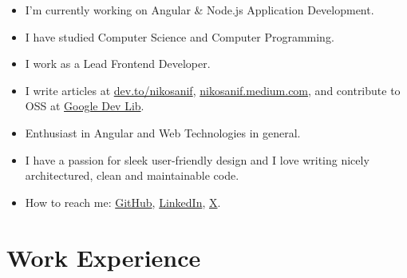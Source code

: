 \documentclass[11pt]{article}
\begin{document}
\footnotesize{
    \begin{itemize}
        \item I'm currently working on Angular \& Node.js Application Development.
        \item I have studied Computer Science and Computer Programming.
        \item I work as a Lead Frontend Developer.
        \item I write articles at 
            \href{https://dev.to/nikosanif}{ dev.to/nikosanif},
            \href{https://nikosanif.medium.com/}{ nikosanif.medium.com},
            and contribute to OSS at \href{https://devlibrary.withgoogle.com/authors/nikosanif}{ Google Dev Lib}.
        \item Enthusiast in Angular and Web Technologies in general.
        \item I have a passion for sleek user-friendly design and I love writing nicely architectured, clean and maintainable code.
        \item How to reach me: 
            \href{https://github.com/nikosanif}{ GitHub},
            \href{https://www.linkedin.com/in/nikosanifantis/}{ LinkedIn},
            \href{https://x.com/nikosanif}{ X}.
    \end{itemize}
}


\section{Work Experience}
\end{document}
